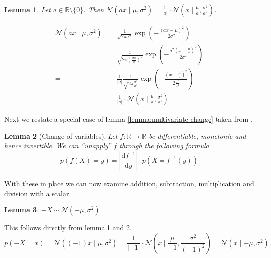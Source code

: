 \documentclass[11pt,a4paper]{book}
\newtheorem{lemma}{Lemma}
\begin{document}
\begin{lemma}
  \label{lemma:gaussian-parameter-scaling}
  Let $a \in \mathbb{R} \setminus \{ 0 \}$. Then
  $\mathcal{N}(ax \mid \mu, \sigma^{2}) = \frac{1}{|a|} \cdot \mathcal{N}\left(x \mid
  \frac{\mu}{a}, \frac{\sigma^{2}}{a^{2}}\right)$.
\end{lemma}
\begin{proof2}
  \begin{align*}
    \mathcal{N}(ax \mid \mu, \sigma^{2}) = & \frac{1}{\sqrt{2 \pi \sigma^{2}}} \exp\left( -\frac{\left(ax - \mu \right)^{2}}{2\sigma^{2}} \right)\\
    = & \frac{1}{\sqrt{2 \pi \left( \frac{\sigma a}{a} \right)^{2}}} \exp\left( -\frac{a^{2}\left(x - \frac{\mu}{a} \right)^{2}}{2\sigma^{2}} \right)\\
    = & \frac{1}{|a|} \frac{1}{\sqrt{2 \pi \frac{\sigma^{2}}{a^{2}}}} \exp\left( -\frac{\left(x - \frac{\mu}{a} \right)^{2}}{2 \frac{\sigma^{2}}{a^{2}}} \right)\\
    = & \frac{1}{|a|} \cdot \mathcal{N}\left( x \mid \frac{\mu}{a}, \frac{\sigma^{2}}{a^{2}} \right)
  \end{align*}
\end{proof2}

Next we restate a special case of lemma \ref{lemma:multivariate-change} taken
from \cite[chapter~2.6.2]{murphy}.
\begin{lemma}[Change of variables]
  \label{lemma:change}
  Let $f : \mathbb{R} \rightarrow \mathbb{R}$ be differentiable, monotonic and
  hence invertible. We can ``unapply'' $f$ through the following formula
  \begin{equation*}
    p(f(X) = y) = \left| \frac{\mathrm{d}f^{-1}}{\mathrm{d}y} \right| \cdot p(X = f^{-1}(y))
  \end{equation*}
\end{lemma}

With these in place we can now examine addition, subtraction, multiplication and
division with a scalar.

\vspace{1em}

\begin{lemma}
  $-X \sim \mathcal{N}(-\mu, \sigma^{2})$
\end{lemma}
\begin{proof2}
  This follows directly from lemma \ref{lemma:gaussian-parameter-scaling} and
  \ref{lemma:change}.
  \begin{equation*}
    p(-X = x) = \mathcal{N}((-1)x \mid \mu, \sigma^{2}) = \frac{1}{|{-1}|} \cdot \mathcal{N}\left( x \mid \frac{\mu}{{-1}}, \frac{\sigma^{2}}{({-1})^{2}} \right) = \mathcal{N}(x \mid {-\mu}, \sigma^{2})
  \end{equation*}
\end{proof2}
\end{document}
